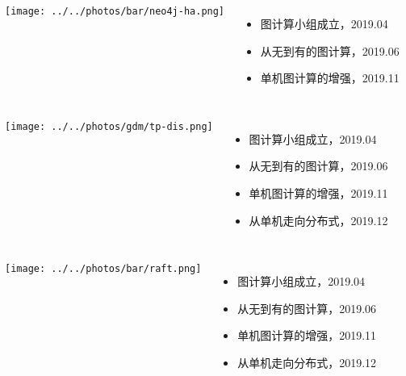 \documentclass{beamer}
\begin{document}
  \begin{frame}
  \begin{columns}
  \texttt{[image: ../../photos/bar/neo4j-ha.png]}

  \begin{itemize}
  \item 图计算小组成立，2019.04
  \item 从无到有的图计算，2019.06
  \item 单机图计算的增强，2019.11
  \end{itemize}
  \end{columns}

  \end{frame}


  \begin{frame}
  \begin{columns}
  \texttt{[image: ../../photos/gdm/tp-dis.png]}

  \begin{itemize}
  \item 图计算小组成立，2019.04
  \item 从无到有的图计算，2019.06
  \item 单机图计算的增强，2019.11
  \item 从单机走向分布式，2019.12
  \end{itemize}
  \end{columns}

  \end{frame}

  \begin{frame}
  \begin{columns}
  \texttt{[image: ../../photos/bar/raft.png]}

  \begin{itemize}
  \item 图计算小组成立，2019.04
  \item 从无到有的图计算，2019.06
  \item 单机图计算的增强，2019.11
  \item 从单机走向分布式，2019.12
  \end{itemize}
  \end{columns}

  \end{frame}
\end{document}
